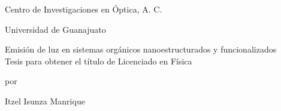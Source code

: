 \addtolength{\hoffset}{-0.5cm}
\begin{titlepage}
\begin{center}
{\LARGE{

   {{
   \begin{figure}%
\endminipage\hfill
{}
\endminipage
\end{figure}
   
   
   {
   \vspace{1.4cm}

{{{{{\LARGE Centro de Investigaciones en \'Optica, A. C. }}}}}\\   
    \vspace{.5cm}
    
    \LARGE Universidad de Guanajuato
    

    
   }}}}
\vspace{1.3cm}

{\ttfamily
{\Huge  Emisi\'on de luz en  \vspace{0.2cm}sistemas org\'anicos nanoestructurados  \vspace{0.2cm}y funcionalizados}\\
\vspace{0.8cm}
    {\large Tesis para obtener el t\'itulo de Licenciado en F\'isica }


{\large{por}}
\vspace{0.5cm}

{\LARGE {Itzel Isunza Manrique}}
}


\vspace{0.6cm}

{\large{}}
\vspace{0.7cm}
{\LARGE{}}


\vfill
\vspace{0.9cm}
\large{\ttfamily{\today}}
}
\end{center}
\end{titlepage}


